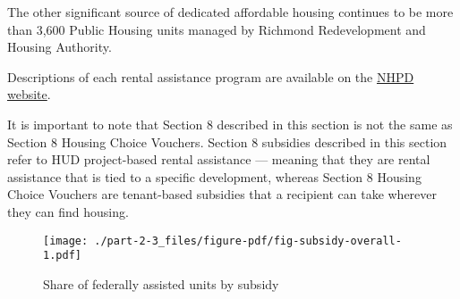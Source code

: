 \documentclass[
  letterpaper,
  DIV=11,
  numbers=noendperiod]{scrreprt}
\begin{document}
The other significant source of dedicated affordable housing continues
to be more than 3,600 Public Housing units managed by Richmond
Redevelopment and Housing Authority.

\begin{tcolorbox}[enhanced jigsaw, colframe=quarto-callout-note-color-frame, arc=.35mm, bottomrule=.15mm, colbacktitle=quarto-callout-note-color!10!white, opacityback=0, left=2mm, rightrule=.15mm, title=\textcolor{quarto-callout-note-color}{\faInfo}\hspace{0.5em}{Note}, colback=white, coltitle=black, toptitle=1mm, leftrule=.75mm, titlerule=0mm, breakable, opacitybacktitle=0.6, toprule=.15mm, bottomtitle=1mm]

Descriptions of each rental assistance program are available on the
\href{https://preservationdatabase.org/documentation/program-descriptions/}{NHPD
website}.

\end{tcolorbox}

\begin{tcolorbox}[enhanced jigsaw, colframe=quarto-callout-important-color-frame, arc=.35mm, bottomrule=.15mm, colbacktitle=quarto-callout-important-color!10!white, opacityback=0, left=2mm, rightrule=.15mm, title=\textcolor{quarto-callout-important-color}{\faExclamation}\hspace{0.5em}{Important}, colback=white, coltitle=black, toptitle=1mm, leftrule=.75mm, titlerule=0mm, breakable, opacitybacktitle=0.6, toprule=.15mm, bottomtitle=1mm]

It is important to note that Section 8 described in this section is not
the same as Section 8 Housing Choice Vouchers. Section 8 subsidies
described in this section refer to HUD project-based rental assistance
--- meaning that they are rental assistance that is tied to a specific
development, whereas Section 8 Housing Choice Vouchers are tenant-based
subsidies that a recipient can take wherever they can find housing.

\end{tcolorbox}

\begin{figure}

{\centering \texttt{[image: ./part-2-3\_files/figure-pdf/fig-subsidy-overall-1.pdf]}

}

\caption{\label{fig-subsidy-overall}Share of federally assisted units by
subsidy}

\end{figure}
\end{document}
